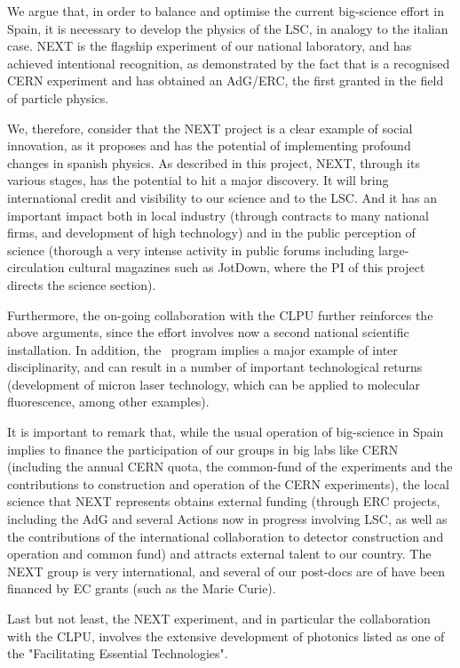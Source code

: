 We argue that, in order to balance and optimise the current big-science effort in Spain, it is necessary to develop the physics of the LSC, in analogy to the italian case. NEXT is the flagship experiment of our national laboratory, and has achieved intentional recognition, as demonstrated by the fact that is a recognised CERN experiment and has obtained an AdG/ERC, the first granted in the field of particle physics. 

We, therefore, consider that the NEXT project is a clear example of social innovation, as it proposes and has the potential of implementing profound changes in spanish physics. As described in this project, NEXT, through its various stages, has the potential to hit a major discovery. It will bring international credit and visibility to our science and to the LSC. And it has an important impact both in local industry (through contracts to many national firms, and development of high technology) and in the public perception of science (thorough a very intense activity in public forums including large-circulation cultural magazines such as JotDown, where the PI of this project directs the science section). 

Furthermore, the on-going collaboration with the CLPU further reinforces the above arguments, since the effort involves now a second national scientific installation. In addition, the \BATA\ program implies a major example of inter disciplinarity, and can result in a number of important technological returns (development of micron laser technology, which can be applied to molecular fluorescence, among other examples).

It is important to remark that, while the usual operation of big-science in Spain implies to finance the participation of our groups in big labs like CERN (including the annual CERN quota, the common-fund of the experiments and the contributions to construction and operation of the CERN experiments), the local science that NEXT represents obtains external funding (through ERC projects, including the AdG and several Actions now in progress involving LSC, as well as the contributions of the international collaboration to detector construction and operation and common fund) and attracts external talent to our country. The NEXT group is very international, and several of our post-docs are of have been financed by EC grants (such as the Marie Curie). 

Last but not least, the NEXT experiment, and in particular the collaboration with the CLPU, involves the extensive development of photonics listed as one of the  "Facilitating Essential Technologies".